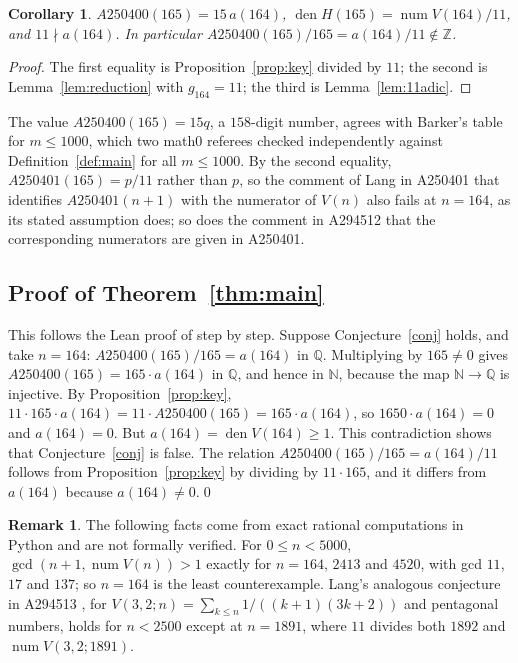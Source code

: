 \documentclass[11pt]{amsart}
\theoremstyle{plain}
\newtheorem{corollary}[theorem]{Corollary}
\theoremstyle{definition}
\newtheorem{remark}[theorem]{Remark}
\newcommand{\N}{\mathbb{N}}
\newcommand{\Q}{\mathbb{Q}}
\newcommand{\Z}{\mathbb{Z}}
\DeclareMathOperator{\num}{num}
\DeclareMathOperator{\den}{den}
\begin{document}
\begin{corollary}\label{cor:exact}
$A250400(165)=15\,a(164)$, $\den H(165)=\num V(164)/11$, and $11\nmid a(164)$. In particular $A250400(165)/165=a(164)/11\notin\Z$.
\end{corollary}

\begin{proof}
The first equality is Proposition~\ref{prop:key} divided by $11$; the second is Lemma~\ref{lem:reduction} with $g_{164}=11$; the third is Lemma~\ref{lem:11adic}.
\end{proof}

The value $A250400(165)=15q$, a $158$-digit number, agrees with Barker's table \cite{A250400} for $m\le1000$, which two math0 referees checked independently against Definition~\ref{def:main} for all $m\le 1000$. By the second equality, $A250401(165)=p/11$ rather than $p$, so the comment of Lang in A250401 that identifies $A250401(n+1)$ with the numerator of $V(n)$ also fails at $n=164$, as its stated assumption does; so does the comment in A294512 that the corresponding numerators are given in A250401.

\subsection{Proof of Theorem~\ref{thm:main}}\label{sec:deduction}
This follows the Lean proof of  step by step. Suppose Conjecture~\ref{conj} holds, and take $n=164$: $A250400(165)/165=a(164)$ in $\Q$. Multiplying by $165\ne0$ gives $A250400(165)=165\cdot a(164)$ in $\Q$, and hence in $\N$, because the map $\N\to\Q$ is injective. By Proposition~\ref{prop:key}, $11\cdot165\cdot a(164)=11\cdot A250400(165)=165\cdot a(164)$, so $1650\cdot a(164)=0$ and $a(164)=0$. But $a(164)=\den V(164)\ge1$. This contradiction shows that Conjecture~\ref{conj} is false. The relation $A250400(165)/165=a(164)/11$ follows from Proposition~\ref{prop:key} by dividing by $11\cdot165$, and it differs from $a(164)$ because $a(164)\ne0$.\qed

\begin{remark}\label{rem:more}
The following facts come from exact rational computations in Python and are not formally verified.
For $0\le n<5000$, $\gcd(n+1,\num V(n))>1$ exactly for $n=164$, $2413$ and $4520$, with gcd $11$, $17$ and $137$; so $n=164$ is the least counterexample.
Lang's analogous conjecture in A294513 \cite{A294513}, for $V(3,2;n)=\sum_{k\le n}1/((k+1)(3k+2))$ and pentagonal numbers, holds for $n<2500$ except at $n=1891$, where $11$ divides both $1892$ and $\num V(3,2;1891)$.
\end{remark}
\end{document}
